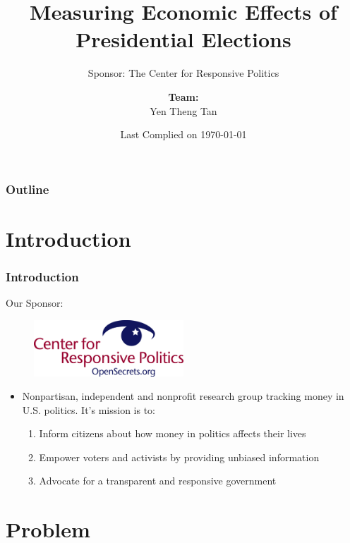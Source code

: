 \documentclass[compress,handout,10pt]{beamer}
\title{{\color{black} \LARGE Measuring Economic Effects of Presidential Elections\newline} }
\subtitle{{\color{black} \large Sponsor: The Center for Responsive Politics} }
\author{ 
    {\bf{Team:}} \\ 
Yen Theng Tan \\ 
    \vspace{5pt}
}
\institute{Department of Applied Mathematics and Statistics, Johns Hopkins University  }
\date{\mygreen Last Complied on \today}
\let\olditem\item
\renewcommand{\item}{\setlength{\itemsep}{0.5\baselineskip}\olditem}
\begin{document}
\begin{frame}[plain]
    \titlepage
\end{frame}

\begin{frame}
    \frametitle{Outline}
    \tableofcontents
\end{frame}

\section{Introduction}
\begin{frame}
    \frametitle{Introduction}

Our Sponsor:
\begin{center}
    \begin{figure}
            \includegraphics[width=0.5\textwidth]{images/CRP.jpeg}
    \end{figure}
    \vspace{10pt}

\begin{itemize}
\pause \item Nonpartisan, independent and nonprofit research group tracking money in U.S. politics. It's mission is to:
\vspace{7pt}
\begin{enumerate}
\pause \item Inform citizens about how money in politics affects their lives
\pause \item Empower voters and activists by providing unbiased information
\pause \item Advocate for a transparent and responsive government
\end{enumerate}
\end{itemize}
\end{center}
\end{frame}

\section{Problem}
\end{document}
